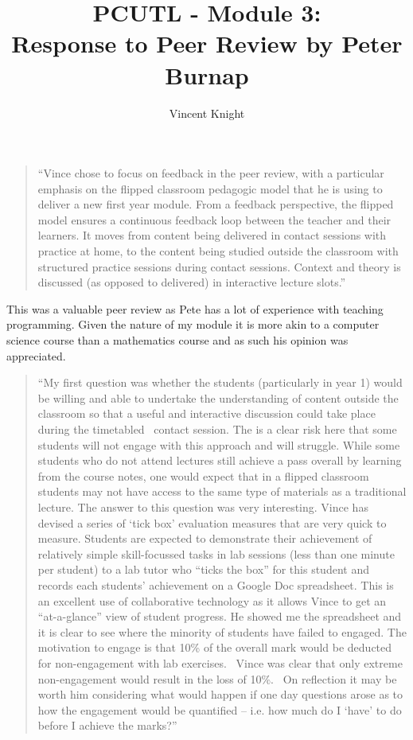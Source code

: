 \documentclass{article}
\title{PCUTL - Module 3:\\ Response to Peer Review by Peter Burnap}
\author{Vincent Knight}
\date{}
\begin{document}
\maketitle

\begin{quote}
``Vince chose to focus on feedback in the peer review, with a particular emphasis on the flipped classroom pedagogic model that he is using to deliver a new first year module. From a feedback perspective, the flipped model ensures a continuous feedback loop between the teacher and their learners. It moves from content being delivered in contact sessions with practice at home, to the content being studied outside the classroom with structured practice sessions during contact sessions. Context and theory is discussed (as opposed to delivered) in interactive lecture slots.''
\end{quote}

This was a valuable peer review as Pete has a lot of experience with teaching programming. Given the nature of my module it is more akin to a computer science course than a mathematics course and as such his opinion was appreciated.

\begin{quote}
``My first question was whether the students (particularly in year 1) would be willing and able to undertake the understanding of content outside the classroom so that a useful and interactive discussion could take place during the timetabled  contact session. The is a clear risk here that some students will not engage with this approach and will struggle. While some students who do not attend lectures still achieve a pass overall by learning from the course notes, one would expect that in a flipped classroom students may not have access to the same type of materials as a traditional lecture. The answer to this question was very interesting. Vince has devised a series of `tick box' evaluation measures that are very quick to measure. Students are expected to demonstrate their achievement of relatively simple skill-focussed tasks in lab sessions (less than one minute per student) to a lab tutor who “ticks the box” for this student and records each students’ achievement on a Google Doc spreadsheet. This is an excellent use of collaborative technology as it allows Vince to get an “at-a-glance” view of student progress. He showed me the spreadsheet and it is clear to see where the minority of students have failed to engaged. The motivation to engage is that 10\% of the overall mark would be deducted for non-engagement with lab exercises.  Vince was clear that only extreme non-engagement would result in the loss of 10\%.  On reflection it may be worth him considering what would happen if one day questions arose as to how the engagement would be quantified – i.e. how much do I `have' to do before I achieve the marks?''
\end{quote}
\end{document}
